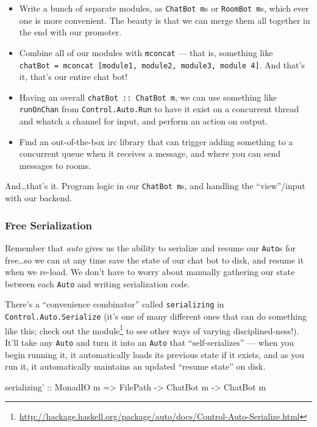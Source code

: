 \documentclass[]{article}
\newenvironment{Shaded}{}{}
\newcommand{\DataTypeTok}[1]{\textcolor[rgb]{0.56,0.13,0.00}{{#1}}}
\newcommand{\OtherTok}[1]{\textcolor[rgb]{0.00,0.44,0.13}{{#1}}}
\newcommand{\NormalTok}[1]{{#1}}
\renewcommand{\href}[2]{#2\footnote{\url{#1}}}
\begin{document}
\begin{itemize}
\tightlist
\item
  Write a bunch of separate modules, as \texttt{ChatBot\ m}s or \texttt{RoomBot\ m}s, which ever one
  is more convenient. The beauty is that we can merge them all together in the end with our
  promoter.
\item
  Combine all of our modules with \texttt{mconcat} --- that is, something like
  \texttt{chatBot\ =\ mconcat\ {[}module1,\ module2,\ module3,\ module\ 4{]}}. And that's it, that's
  our entire chat bot!
\item
  Having an overall \texttt{chatBot\ ::\ ChatBot\ m}, we can use something like \texttt{runOnChan}
  from \texttt{Control.Auto.Run} to have it exist on a concurrent thread and whatch a channel for
  input, and perform an action on output.
\item
  Find an out-of-the-box irc library that can trigger adding something to a concurrent queue when it
  receives a message, and where you can send messages to rooms.
\end{itemize}

And\ldots{}that's it. Program logic in our \texttt{ChatBot\ m}s, and handling the ``view''/input
with our backend.

\subsubsection{Free Serialization}\label{free-serialization}

Remember that \emph{auto} gives us the ability to serialize and resume our \texttt{Auto}s for
free\ldots{}so we can at any time save the state of our chat bot to disk, and resume it when we
re-load. We don't have to worry about manually gathering our state between each \texttt{Auto} and
writing serialization code.

There's a ``convenience combinator'' called \texttt{serializing\textquotesingle{}} in
\texttt{Control.Auto.Serialize} (it's one of many different ones that can do something like this;
\href{http://hackage.haskell.org/package/auto/docs/Control-Auto-Serialize.html}{check out the
module} to see other ways of varying disciplined-ness!). It'll take any \texttt{Auto} and turn it
into an \texttt{Auto} that ``self-serializes'' --- when you begin running it, it automatically loads
its previous state if it exists, and as you run it, it automatically maintains an updated ``resume
state'' on disk.

\begin{Shaded}
\begin{Highlighting}[]
\OtherTok{serializing' ::} \DataTypeTok{MonadIO} \NormalTok{m }\OtherTok{=>} \NormalTok{FilePath }\OtherTok{->} \DataTypeTok{ChatBot} \NormalTok{m }\OtherTok{->} \DataTypeTok{ChatBot} \NormalTok{m}
\end{Highlighting}
\end{Shaded}
\end{document}
